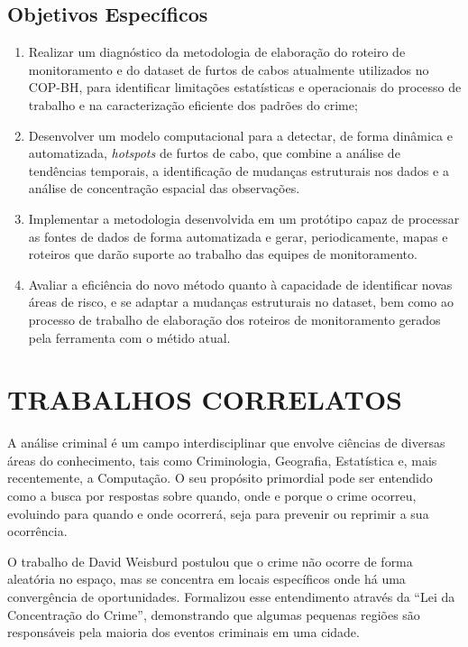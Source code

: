 \subsection{Objetivos Específicos}
\label{subsec:objespc}
\begin{enumerate}
  \item{Realizar um diagnóstico da metodologia de elaboração do roteiro de monitoramento e do dataset de furtos de cabos atualmente utilizados no COP-BH, para identificar limitações estatísticas e operacionais do processo de trabalho e na caracterização eficiente dos padrões do crime;}
  \item{Desenvolver um modelo computacional para a detectar, de forma dinâmica e automatizada, \textit{hotspots} de furtos de cabo, que combine a análise de tendências temporais, a identificação de mudanças estruturais nos dados e a análise de concentração espacial das observações.}
  \item{Implementar a metodologia desenvolvida em um protótipo capaz de processar as fontes de dados de forma automatizada e gerar, periodicamente, mapas e roteiros que darão suporte ao trabalho das equipes de monitoramento.}
  \item{Avaliar a eficiência do novo método quanto à capacidade de identificar novas áreas de risco, e se adaptar a mudanças estruturais no dataset, bem como ao processo de trabalho de elaboração dos roteiros de monitoramento gerados pela ferramenta com o métido atual.}
\end{enumerate}

\section{TRABALHOS CORRELATOS}
\label{sec:estadoarte}
A análise criminal é um campo interdisciplinar que envolve ciências de diversas áreas do conhecimento, tais como Criminologia, Geografia, Estatística e, mais recentemente, a Computação. O seu propósito primordial pode ser entendido como a busca por respostas sobre quando, onde e porque o crime ocorreu, evoluindo para quando e onde ocorrerá, seja para prevenir ou reprimir a sua ocorrência.

O trabalho de David Weisburd \cite{Weisburd2015} postulou que o crime não ocorre de forma aleatória no espaço, mas se concentra em locais específicos onde há uma convergência de oportunidades. Formalizou esse entendimento através da ``Lei da Concentração do Crime'', demonstrando que algumas pequenas regiões são responsáveis pela maioria dos eventos criminais em uma cidade.

